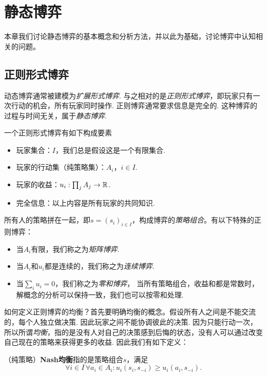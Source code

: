 \chapter{静态博弈}\label{chap:static-game}
本章我们讨论静态博弈的基本概念和分析方法，并以此为基础，讨论博弈中认知相关的问题。

\section{正则形式博弈}
动态博弈通常被建模为\emph{扩展形式博弈}. 与之相对的是\emph{正则形式博弈}，即玩家只有一次行动的机会，所有玩家同时操作. 正则博弈通常要求信息是完全的. 这种博弈的过程与时间无关，属于\emph{静态博弈}.


一个正则形式博弈有如下构成要素
\begin{itemize}
    \item 玩家集合：$I$，我们总是假设这是一个有限集合.
    \item 玩家的行动集（纯策略集）：$A_i$，$i\in I$.
    \item 玩家的收益：$u_i:\prod_j A_j\to\mathbb{R}$.
    \item 完全信息：以上内容是所有玩家的共同知识.
\end{itemize}
所有人的策略拼在一起，即$s=(s_i)_{i\in I}$，构成博弈的\emph{策略组合}。有以下特殊的正则博弈：
\begin{itemize}
    \item 当$A_i$有限，我们称之为\emph{矩阵博弈}.
    \item 当$A_i$和$u_i$都是连续的，我们称之为\emph{连续博弈}.
    \item 当$\sum_i u_i=0$，我们称之为\emph{零和博弈}，
    当所有策略组合，收益和都是常数时，解概念的分析可以保持一致，我们也可以按零和处理. 
\end{itemize}

如何定义正则博弈的均衡？首先要明确均衡的概念。假设所有人之间是不能交流的，每个人独立做决策. 因此玩家之间不能协调彼此的决策. 因为只能行动一次，所以所谓\emph{均衡}，指的是没有人对自己的决策感到后悔的状态，没有人可以通过改变自己现在的策略来获得更多的收益. 因此我们有如下定义：

\begin{definition}[Nash均衡]
（纯策略）\textbf{Nash均衡}指的是策略组合$s$，满足
    \[\forall i\in I\,\forall a_i\in A_i:u_i(s_i,s_{-i})\geq u_i(a_i,s_{-i}).\]
\end{definition}

